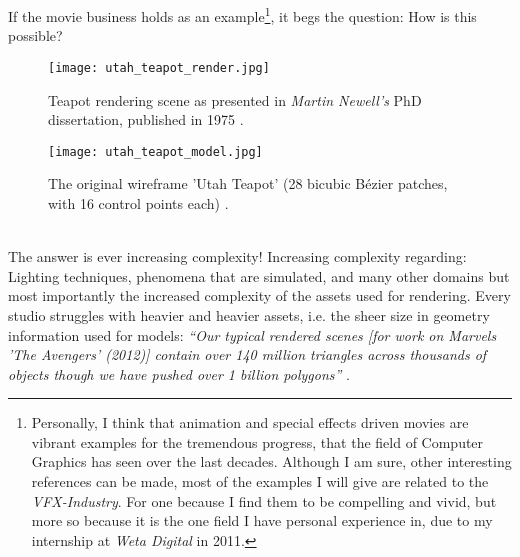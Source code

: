 If the movie business holds as an example\footnote{ Personally, I think that animation and special effects driven movies are vibrant examples for the tremendous progress, that the field of Computer Graphics has seen over the last decades. Although I am sure, other interesting references can be made, most of the examples I will give are related to the \textit{VFX-Industry}. For one because I find them to be compelling and vivid, but more so because it is the one field I have personal experience in, due to my internship at \textit{Weta Digital} in 2011.}, it begs the question: How is this possible?
\begin{figure}[ht]
\begin{minipage}[b]{0.475\linewidth} \centering
\texttt{[image: utah\_teapot\_render.jpg]}
\caption{Teapot rendering scene as presented in \textit{Martin Newell's} PhD dissertation, published in 1975 \citep[cf.][]{Torrence2006}.}
\label{fig:utah_teapot_render}
\end{minipage}
\hspace{0.35cm}
\begin{minipage}[b]{0.475\linewidth}
\centering
\texttt{[image: utah\_teapot\_model.jpg]}
\caption{The original wireframe 'Utah Teapot' (28 bicubic Bézier patches, with 16 control points each) \citep[cf.][]{Newell1975a}.}
\label{fig:utah_teapot_model}
\end{minipage}
\end{figure}\\
The answer is ever increasing complexity!
Increasing complexity regarding: Lighting techniques, phenomena that are simulated, and many other domains but most importantly the increased complexity of the assets used for rendering.
Every studio struggles with heavier and heavier assets, i.e. the sheer size in geometry information used for models:
\textit{``Our typical rendered scenes [for work on Marvels 'The Avengers' (2012)] contain over 140 million triangles across thousands of objects though we have pushed over 1 billion polygons''} \citep[Votch Levi, CTO Whiskytree, cited in:][]{Seymour2012}.

